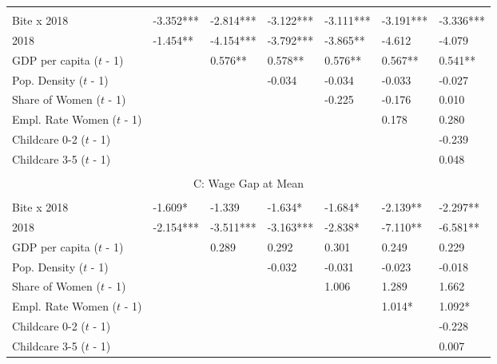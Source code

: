 \documentclass[12pt,draft,a4paper]{article}
\begin{document}
\begin{table}[htbp]
\begin{adjustbox}{width=\textwidth}
\begin{tabular}{l@{\hskip 10ex}llllll}
    \hline & \\[-1.0em]
    Bite x 2018               & -3.352*** & -2.814*** & -3.122*** & -3.111*** & -3.191*** & -3.336*** \\
    2018                      & -1.454**  & -4.154*** & -3.792*** & -3.865**  & -4.612    & -4.079    \\
    GDP per capita ($t$ - 1)   &           & 0.576**   & 0.578**   & 0.576**   & 0.567**   & 0.541**   \\
    Pop. Density ($t$ - 1)     &           &           & -0.034    & -0.034    & -0.033    & -0.027    \\
    Share of Women ($t$ - 1)   &           &           &           & -0.225    & -0.176    & 0.010     \\
    Empl. Rate Women ($t$ - 1) &           &           &           &           & 0.178     & 0.280     \\
    Childcare 0-2 ($t$ - 1)    &           &           &           &           &           & -0.239    \\
    Childcare 3-5 ($t$ - 1)    &           &           &           &           &           & 0.048     \\ 
    \hline & \\[-1.0em]
    \multicolumn{7}{c}{C: Wage Gap at Mean}                                                           \\ 
    \hline & \\[-1.0em]
    Bite x 2018               & -1.609*   & -1.339    & -1.634*   & -1.684*   & -2.139**  & -2.297**  \\
    2018                      & -2.154*** & -3.511*** & -3.163*** & -2.838*   & -7.110**  & -6.581**  \\
    GDP per capita ($t$ - 1)   &           & 0.289     & 0.292     & 0.301     & 0.249     & 0.229     \\
    Pop. Density ($t$ - 1)     &           &           & -0.032    & -0.031    & -0.023    & -0.018    \\
    Share of Women ($t$ - 1)   &           &           &           & 1.006     & 1.289     & 1.662     \\
    Empl. Rate Women ($t$ - 1) &           &           &           &           & 1.014*    & 1.092*    \\
    Childcare 0-2 ($t$ - 1)    &           &           &           &           &           & -0.228    \\
    Childcare 3-5 ($t$ - 1)    &           &           &           &           &           & 0.007     \\ 

\end{tabular}
\end{adjustbox}
\end{table}
\end{document}
